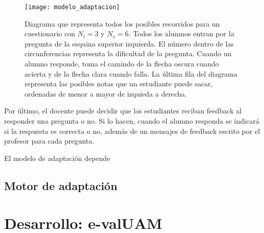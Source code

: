 \begin{figure}[htp!]
	\centering
	\texttt{[image: modelo\_adaptacion]}
	\caption[Modelo de adpatación]{Diagrama que representa todos los posibles recorridos para un cuestionario con $N_l = 3$ y $N_v = 6$. Todos los alumnos entran por la pregunta de la esquina superior izquierda. El número dentro de las circunferencias representa la dificultad de la pregunta. Cuando un alumno responde, toma el camindo de la flecha oscura cuando acierta y de la flecha clara cuando falla. La última fila del diagrama representa las posibles notas que un estudiante puede sacar, ordenadas de menor a mayor de izquieda a derecha.}
	\label{fig:modelo de adaptacion}
\end{figure}


Por último, el docente puede decidir que los estudiantes reciban feedback al responder una pregunta o no. Si lo hacen, cuando el alumno responda se indicará si la respuesta es correcta o no, además de un mensajes de feedback escrito por el profesor para cada pregunta.



El modelo de adaptación depende  


\subsection{Motor de adaptación}






\section{Desarrollo: e-valUAM\label{sec:desarrollo}}

